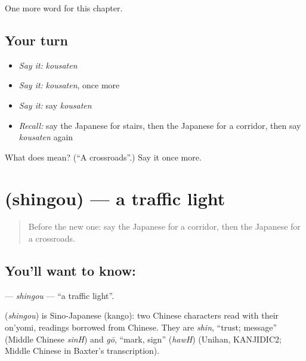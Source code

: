\begin{grammarlens}[title={What you've built}]
One more word for this chapter.
\end{grammarlens}

\subsection*{Your turn}
\begin{itemize}
\raggedright
  \item \emph{Say it:} \emph{kousaten}
  \item \emph{Say it:} \emph{kousaten}, once more
  \item \emph{Say it:} say \emph{kousaten}
  \item \emph{Recall:} say the Japanese for stairs, then the Japanese for a corridor, then say \emph{kousaten} again
\end{itemize}

\begin{tcolorbox}[breakable,colback=teal!4,colframe=teal!35!black,title={Before you move on}]
What does  mean? (\textquotedblleft{}A crossroads\textquotedblright{}.) Say it once more.
\end{tcolorbox}
\section[\texorpdfstring{\ja{しんごう} (shingou)}{しんごう (shingou)}]{ (shingou) — a traffic light}

\label{lesson:JA-C80-shingou}



\begin{quote}
Before the new one: say the Japanese for a corridor, then the Japanese for a crossroads.
\end{quote}

\subsection*{You'll want to know: }
\textbf{} — \emph{shingou} — \textquotedblleft{}a traffic light\textquotedblright{}.

\begin{cousinweb}
\textbf{} (\emph{shingou}) is Sino-Japanese (kango): two Chinese characters read with their on'yomi, readings borrowed from Chinese. They are \emph{shin}, \textquotedblleft{}trust; message\textquotedblright{} (Middle Chinese \emph{sinH}) and \emph{gō}, \textquotedblleft{}mark, sign\textquotedblright{} (\emph{hawH}) (Unihan, KANJIDIC2; Middle Chinese in Baxter's transcription).
\end{cousinweb}

